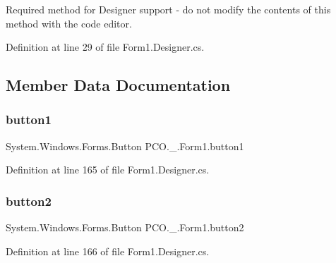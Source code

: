 Required method for Designer support -\/ do not modify the contents of this method with the code editor. 



Definition at line 29 of file Form1.\+Designer.\+cs.



\subsection{Member Data Documentation}
\mbox{\label{classPCO_1_1__0_1_1Form1_af3e0364451a4d42b57d6e88d9b228b76}} 
\subsubsection{\texorpdfstring{button1}{button1}}
{\footnotesize\ttfamily System.\+Windows.\+Forms.\+Button P\+C\+O.\+\_.\+Form1.\+button1\hspace{0.3cm}{\ttfamily [private]}}



Definition at line 165 of file Form1.\+Designer.\+cs.

\mbox{\label{classPCO_1_1__0_1_1Form1_a7fae69d92446bd162912641481525170}} 
\subsubsection{\texorpdfstring{button2}{button2}}
{\footnotesize\ttfamily System.\+Windows.\+Forms.\+Button P\+C\+O.\+\_.\+Form1.\+button2\hspace{0.3cm}{\ttfamily [private]}}



Definition at line 166 of file Form1.\+Designer.\+cs.

\mbox{\label{classPCO_1_1__0_1_1Form1_a99473f0eda59346164d688a87a891ed1}} 
